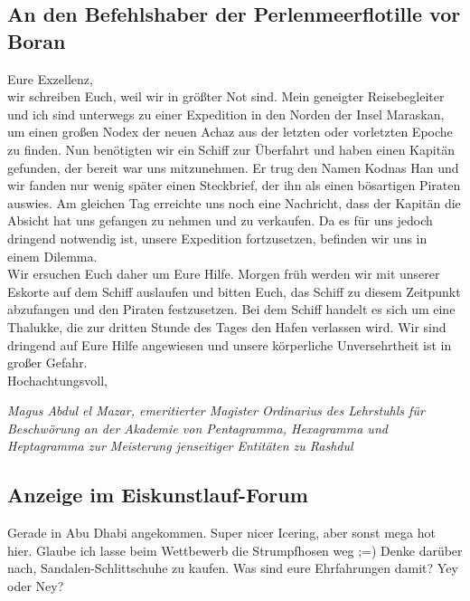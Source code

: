 \documentclass[final]{multiversum}
\begin{document}
\subsection{An den Befehlshaber der Perlenmeerflotille vor Boran}
Eure Exzellenz,\\[1em]
wir schreiben Euch, weil wir in größter Not sind.
Mein geneigter Reisebegleiter und ich sind unterwegs zu einer Expedition in den Norden der Insel Maraskan, um einen großen Nodex der neuen Achaz aus der letzten oder vorletzten Epoche zu finden.
Nun benötigten wir ein Schiff zur Überfahrt und haben einen Kapitän gefunden, der bereit war uns mitzunehmen.
Er trug den Namen Kodnas Han und wir fanden nur wenig später einen Steckbrief, der ihn als einen bösartigen Piraten auswies.
Am gleichen Tag erreichte uns noch eine Nachricht, dass der Kapitän die Absicht hat uns gefangen zu nehmen und zu verkaufen.
Da es für uns jedoch dringend notwendig ist, unsere Expedition fortzusetzen, befinden wir uns in einem Dilemma.\\
Wir ersuchen Euch daher um Eure Hilfe.
Morgen früh werden wir mit unserer Eskorte auf dem Schiff auslaufen und bitten Euch, das Schiff zu diesem Zeitpunkt abzufangen und den Piraten festzusetzen.
Bei dem Schiff handelt es sich um eine Thalukke, die zur dritten Stunde des Tages den Hafen verlassen wird.
Wir sind dringend auf Eure Hilfe angewiesen und unsere körperliche Unversehrtheit ist in großer Gefahr.\\[1em]
Hochachtungsvoll,
\begin{flushright}
    \textit{Magus Abdul el Mazar, emeritierter Magister Ordinarius des Lehrstuhls für Beschwörung an der Akademie von Pentagramma, Hexagramma und Heptagramma zur Meisterung jenseitiger Entitäten zu Rashdul}
\end{flushright}

\subsection{Anzeige im Eiskunstlauf-Forum}
Gerade in Abu Dhabi angekommen. 
Super nicer Icering, aber sonst mega hot hier.
Glaube ich lasse beim Wettbewerb die Strumpfhosen weg ;=)
Denke darüber nach, Sandalen-Schlittschuhe zu kaufen.
Was sind eure Ehrfahrungen damit?
Yey oder Ney?

\end{document}
